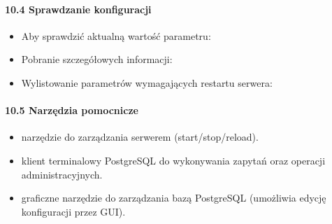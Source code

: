 \documentclass[letterpaper,10pt,polish]{sphinxmanual}
\begin{document}
\paragraph{10.4 Sprawdzanie konfiguracji}
\label{\detokenize{rozdzial2/Konfiguracja_baz_danych/Konfiguracja_baz_danych:sprawdzanie-konfiguracji}}\begin{itemize}
\item {} 
\sphinxAtStartPar
Aby sprawdzić aktualną wartość parametru:

\begin{sphinxVerbatim}[commandchars=\\\{\}]
 
\end{sphinxVerbatim}

\item {} 
\sphinxAtStartPar
Pobranie szczegółowych informacji:

\begin{sphinxVerbatim}[commandchars=\\\{\}]
     
 
   
\end{sphinxVerbatim}

\item {} 
\sphinxAtStartPar
Wylistowanie parametrów wymagających restartu serwera:

\begin{sphinxVerbatim}[commandchars=\\\{\}]
       
\end{sphinxVerbatim}

\end{itemize}


\paragraph{10.5 Narzędzia pomocnicze}
\label{\detokenize{rozdzial2/Konfiguracja_baz_danych/Konfiguracja_baz_danych:narzedzia-pomocnicze}}\begin{itemize}
\item {} 
\sphinxAtStartPar
{} \textendash{} narzędzie do zarządzania serwerem (start/stop/reload).

\item {} 
\sphinxAtStartPar
{} \textendash{} klient terminalowy PostgreSQL do wykonywania zapytań oraz operacji administracyjnych.

\item {} 
\sphinxAtStartPar
{} \textendash{} graficzne narzędzie do zarządzania bazą PostgreSQL (umożliwia edycję konfiguracji przez GUI).

\end{itemize}
\end{document}

